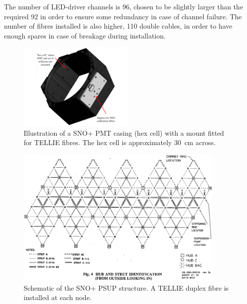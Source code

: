 \documentclass[12pt]{report}
\begin{document}
The number of LED-driver channels is 96, chosen to be slightly larger than the required 92 in order to ensure some redundancy in case of channel failure. The number of fibres installed is also higher, 110 double cables, in order to have enough spares in case of breakage during installation.

\begin{figure}[htp]
	\begin{center}
		\includegraphics[width=0.5\textwidth]{HexCell}
		\caption{Illustration of a SNO+ PMT casing (hex cell) with a mount fitted for TELLIE fibres. The hex cell is approximately 30~cm across.}
		\label{fig:HexCell}
	\end{center}
\end{figure}

\begin{figure}[htp]
	\begin{center}
		\includegraphics[width=0.9\textwidth]{NodePanelMap}
		\caption{Schematic of the SNO+ PSUP structure. A TELLIE duplex fibre is installed at each node.}
		\label{fig:NodePanelMap}
	\end{center}
\end{figure}
\end{document}
